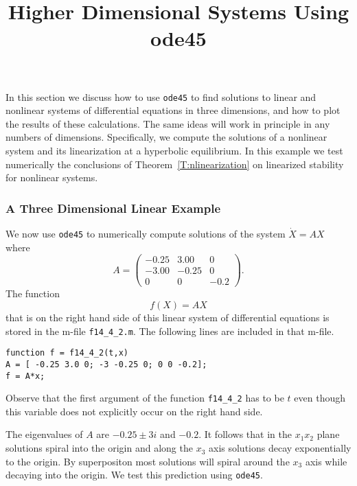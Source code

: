 \documentclass{ximera}
\title{Higher Dimensional Systems Using ode45}
\begin{document}
\begin{abstract}
\end{abstract}
\maketitle

\label{S:ode45HD}

In this section we discuss how to use {\tt ode45} to find solutions to linear
and nonlinear systems of differential equations in three dimensions, and how 
to plot the results of these calculations.  The same ideas will work in 
principle in any numbers of dimensions.  Specifically, we compute the solutions 
of a nonlinear system and its linearization at a hyperbolic equilibrium.  In 
this example we test numerically the conclusions of 
Theorem~\ref{T:nlinearization} on linearized stability for nonlinear systems.

 
\subsubsection*{A Three Dimensional Linear Example}

We now use {\tt ode45} to numerically compute solutions of the system
$\dot{X} = AX$ where 
\begin{equation}  \label{E:3dexample}
A = \left(\begin{array}{rrr}
  -0.25 & 3.00 & 0\\
   -3.00 & -0.25 &  0\\
   0 &  0 & -0.2
\end{array}\right).
\end{equation}
The function  
\begin{equation*}
f(X) = AX
\end{equation*}
that is on the right hand side of this linear system of differential 
equations is stored in the m-file {\tt f14\_4\_2.m}.  The following lines 
are included in that m-file.
\begin{verbatim}
function f = f14_4_2(t,x)
A = [ -0.25 3.0 0; -3 -0.25 0; 0 0 -0.2];
f = A*x;
\end{verbatim}
Observe that the first argument of the function {\tt f14\_4\_2} has to be 
$t$ even though this variable does not explicitly occur on the right hand 
side.  

The eigenvalues of $A$ are $-0.25\pm 3i$ and $-0.2$.  It follows that in the 
$x_1x_2$ plane solutions spiral into the origin and along the $x_3$ axis 
solutions decay exponentially to the origin.  By superpositon most solutions
will spiral around the $x_3$ axis while decaying into the origin.  We test 
this prediction using {\tt ode45}.
\end{document}
